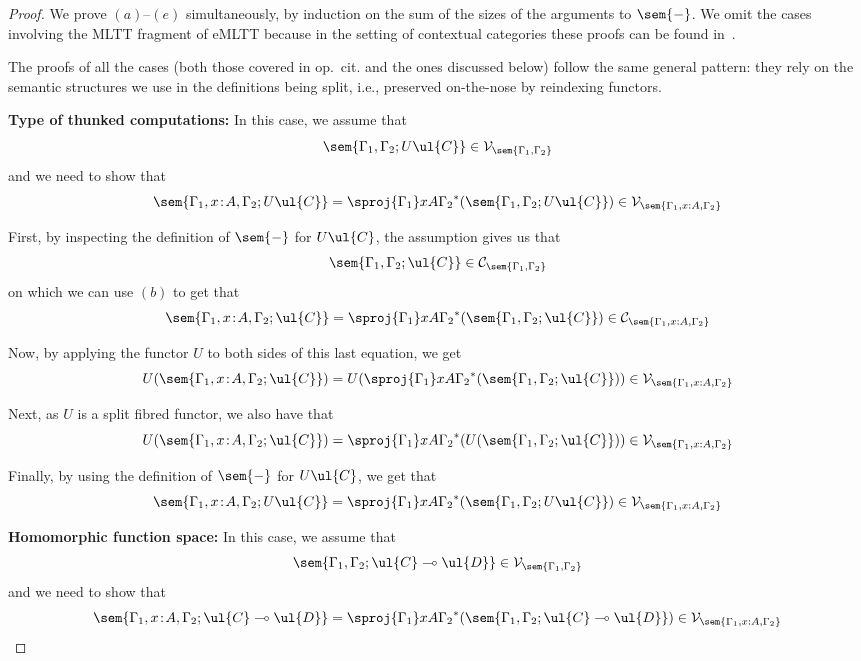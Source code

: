 \begin{proof}
We prove $(a)$--$(e)$ simultaneously, by induction on the sum of the sizes of the arguments to $\sem{-}$. We omit the cases involving the MLTT fragment of eMLTT because in the setting of contextual categories these proofs can be found in~\cite[Chapter~III]{Streicher:Semantics}.

The proofs of all the cases (both those covered in op.~cit. and the ones discussed below) follow the same general pattern: they rely on the semantic structures we use in the definitions being split, i.e.,  preserved on-the-nose by reindexing functors.

\vspace{0.2cm}
\noindent
\textbf{Type of thunked computations:}
In this case, we assume that 
\[
\sem{\Gamma_1,\Gamma_2;U\ul{C}} \in \mathcal{V}_{\sem{\Gamma_1,\Gamma_2}}
\]
and we need to show that 
\[
\sem{\Gamma_1, x \!:\! A,\Gamma_2;U\ul{C}} = \sproj {\Gamma_1} x A {\Gamma_2}^*(\sem{\Gamma_1,\Gamma_2;U\ul{C}}) \in \mathcal{V}_{\sem{\Gamma_1, x : A,\Gamma_2}}
\] 

First, by inspecting the definition of $\sem{-}$ for $U\ul{C}$, the assumption gives us that 
\[
\sem{\Gamma_1,\Gamma_2;\ul{C}} \in \mathcal{C}_{\sem{\Gamma_1,\Gamma_2}}
\]
on which we can use $(b)$ to get that 
\[
\sem{\Gamma_1, x \!:\! A,\Gamma_2;\ul{C}} = \sproj {\Gamma_1} x A {\Gamma_2}^*(\sem{\Gamma_1,\Gamma_2;\ul{C}}) \in \mathcal{C}_{\sem{\Gamma_1, x : A,\Gamma_2}}
\]

Now, by applying the functor $U$ to both sides of this last equation, we get
\[
U(\sem{\Gamma_1, x \!:\! A,\Gamma_2;\ul{C}}) = U(\sproj {\Gamma_1} x A {\Gamma_2}^*(\sem{\Gamma_1,\Gamma_2;\ul{C}})) \in \mathcal{V}_{\sem{\Gamma_1, x : A,\Gamma_2}}
\]

Next, as $U$ is a split fibred functor, we also have that
\[
U(\sem{\Gamma_1, x \!:\! A,\Gamma_2;\ul{C}}) = \sproj {\Gamma_1} x A {\Gamma_2}^*(U(\sem{\Gamma_1,\Gamma_2;\ul{C}})) \in \mathcal{V}_{\sem{\Gamma_1, x : A,\Gamma_2}}
\]

Finally, by using the definition of $\sem{-}$ for $U\ul{C}$, we get that
\[
\sem{\Gamma_1, x \!:\! A,\Gamma_2;U\ul{C}} = \sproj {\Gamma_1} x A {\Gamma_2}^*(\sem{\Gamma_1,\Gamma_2;U\ul{C}}) \in \mathcal{V}_{\sem{\Gamma_1, x : A,\Gamma_2}}
\]

\vspace{0.2cm}
\noindent
\textbf{Homomorphic function space:}
In this case, we assume that
\[
\sem{\Gamma_1,\Gamma_2;\ul{C} \multimap \ul{D}} \in \mathcal{V}_{\sem{\Gamma_1,\Gamma_2}}
\]
and we need to show that
\[
\sem{\Gamma_1, x \!:\! A, \Gamma_2; \ul{C} \multimap \ul{D}} = \sproj {\Gamma_1} x A {\Gamma_2}^*(\sem{\Gamma_1,\Gamma_2;\ul{C} \multimap \ul{D}}) \in \mathcal{V}_{\sem{\Gamma_1, x : A,\Gamma_2}}
\]


\end{proof}
